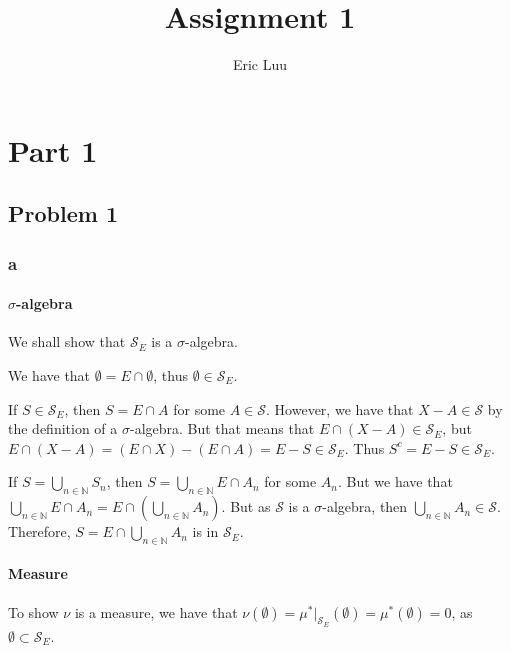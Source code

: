 \documentclass{article}
\title{Assignment 1}
\author{Eric Luu}
\theoremstyle{definition}
\numberwithin{theorem}{section}
\numberwithin{equation}{section}
\newcommand{\sig}{\mathcal{S}}
\newcommand{\salg}{$\sigma$-algebra}
\begin{document}
\maketitle
\section{Part 1}
\subsection{Problem 1}
\newcommand{\Erel}{\mathcal{S}_E}
\subsubsection{a}
\paragraph{\salg}
We shall show that $\Erel$ is a \salg. 
\par
We have that $\emptyset = E \cap \emptyset$, thus $\emptyset \in \Erel$. 
\par
If $S \in \Erel$, then $S = E \cap A$ for some $A \in \sig$. However, we have that $X - A \in \sig$ by the definition of a \salg. But that means that $E \cap (X - A) \in \Erel$, but $E \cap (X - A) = (E \cap X) - (E \cap A) = E - S \in \Erel$. Thus $S^c = E - S \in \Erel$. 
\par
If $S = \bigcup_{n \in \mathbb{N}} S_n$, then $S = \bigcup_{n \in \mathbb{N}} E \cap A_n$ for some $A_n$. But we have that $ \bigcup_{n \in \mathbb{N}} E \cap A_n = E \cap (\bigcup_{n \in \mathbb{N}}A_n)$. But as $\sig$ is a \salg, then $\bigcup_{n \in \mathbb{N}}A_n \in \sig$. Therefore, $S = E \cap \bigcup_{n \in \mathbb{N}}A_n$ is in $\Erel$. 
\paragraph{Measure}
To show $\nu$ is a measure, we have that $\nu(\emptyset) = \mu^*|_{\Erel}(\emptyset) = \mu^*(\emptyset) = 0$, as $\emptyset \subset \Erel$. 
\end{document}
